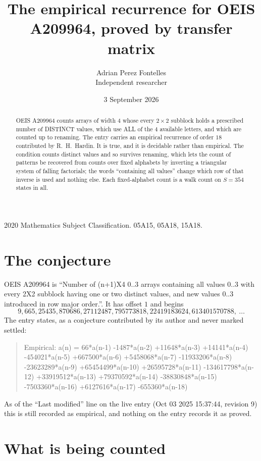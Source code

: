 \documentclass[11pt,a4paper]{article}
\title{The empirical recurrence for OEIS A209964, proved by transfer matrix}
\author{Adrian Perez Fontelles\\ \small Independent researcher}
\date{3 September 2026}
\theoremstyle{plain}
\theoremstyle{definition}
\begin{document}
\maketitle

\begin{abstract}
OEIS A209964 counts arrays of width $4$ whose every $2\times2$ subblock holds a
prescribed number of DISTINCT values, which use ALL of the $4$ available letters, and which
are counted up to renaming. The entry carries an empirical recurrence of order $18$
contributed by R.~H.~Hardin. It is true, and it is decidable rather than empirical. The
condition counts distinct values and so survives renaming, which lets the count of patterns be
recovered from counts over fixed alphabets by inverting a triangular system of falling
factorials; the words ``containing all values'' change which row of that inverse is used and
nothing else. Each fixed-alphabet count is a walk count on $S=354$ states in all.
\end{abstract}

\noindent\small 2020 Mathematics Subject Classification. 05A15, 05A18, 15A18.\normalsize

\section{The conjecture}

OEIS A209964 is ``Number of (n+1)X4 0..3 arrays containing all values 0..3 with every 2X2 subblock having one or two distinct values, and new values 0..3 introduced in row major order.''. It has offset $1$ and begins
\[
9, 665, 25435, 870686, 27112487, 795773818, 22419183624, 613401570788,\ \dots
\]
The entry states, as a conjecture contributed by its author and never marked settled:
\begin{quote}
Empirical: a(n) = 66*a(n-1) -1487*a(n-2) +11648*a(n-3) +14141*a(n-4) -454021*a(n-5) +667500*a(n-6) +5458068*a(n-7) -11933206*a(n-8) -23623289*a(n-9) +65454499*a(n-10) +26595728*a(n-11) -134617798*a(n-12) +33919512*a(n-13) +79370592*a(n-14) -38830848*a(n-15) -7503360*a(n-16) +6127616*a(n-17) -655360*a(n-18)
\end{quote}
As of the ``Last modified'' line on the live entry (Oct 03 2025 15:37:44, revision 9) this is still
recorded as empirical, and nothing on the entry records it as proved.

\section{What is being counted}
\end{document}
